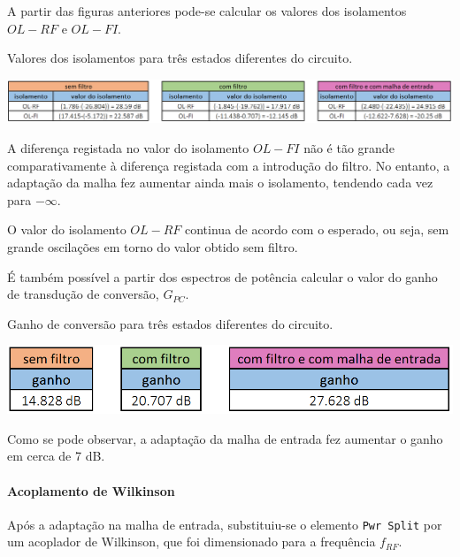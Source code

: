 \documentclass[11pt]{article}
\numberwithin{equation}{section}
\begin{document}
A partir das figuras anteriores pode-se calcular os valores dos isolamentos $OL - RF$ e $OL - FI$.

\pagebreak

\begin{table}[h]
	\centering
	\caption{Valores dos isolamentos para três estados diferentes do circuito.}
	\vspace{-1.5mm}
	\includegraphics[keepaspectratio=true, scale=0.40]{teoricas/isolamentosSemComFiltroMalha}
\end{table}

A diferença registada no valor do isolamento $OL - FI$ não é tão grande comparativamente à diferença registada com a introdução do filtro. No entanto, a adaptação da malha fez aumentar ainda mais o isolamento, tendendo cada vez para $- \infty$. 

O valor do isolamento $OL - RF$ continua de acordo com o esperado, ou seja, sem grande oscilações em torno do valor obtido sem filtro.

É também possível a partir dos espectros de potência calcular o valor do ganho de transdução de conversão, $G_{PC}$.

\begin{table}[h]
	\centering
	\caption{Ganho de conversão para três estados diferentes do circuito.}
	\vspace{-1.5mm}
	\includegraphics[keepaspectratio=true, scale=0.40]{teoricas/ganhoSemComFiltroMalha}
\end{table}

Como se pode observar, a adaptação da malha de entrada fez aumentar o ganho em cerca de 7 dB.

\paragraph{Acoplamento de Wilkinson} \hspace{0pt} 

Após a adaptação na malha de entrada, substituiu-se o elemento \texttt{Pwr Split} por um acoplador de Wilkinson, que foi dimensionado para a frequência $ f_{RF} $.
\end{document}
